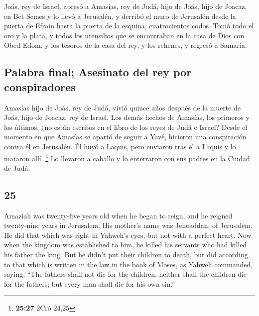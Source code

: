 \begin{paracol}{2}
 Joás, rey de Israel, apresó a Amasías, rey de Judá, hijo
de Joás, hijo de Joacaz, en Bet Semes y lo llevó a Jerusalén, y derribó
el muro de Jerusalén desde la puerta de Efraín hasta la puerta de la
esquina, cuatrocientos codos.  Tomó todo el oro y la
plata, y todos los utensilios que se encontraban en la casa de Dios con
Obed-Edom, y los tesoros de la casa del rey, y los rehenes, y regresó a
Samaria.

\hypertarget{palabra-final-asesinato-del-rey-por-conspiradores}{%
\subsection{Palabra final; Asesinato del rey por
conspiradores}\label{palabra-final-asesinato-del-rey-por-conspiradores}}

 Amasías hijo de Joás, rey de Judá, vivió quince años
después de la muerte de Joás, hijo de Joacaz, rey de Israel.
 Los demás hechos de Amasías, los primeros y los últimos,
¿no están escritos en el libro de los reyes de Judá e Israel?
 Desde el momento en que Amasías se apartó de seguir a
Yavé, hicieron una conspiración contra él en Jerusalén. Él huyó a
Laquis, pero enviaron tras él a Laquis y lo mataron allí. \footnote{\textbf{25:27}
  2Cró 24,25}  Lo llevaron a caballo y lo enterraron con
sus padres en la Ciudad de Judá.

\switchcolumn
\begin{otherlanguage}{english}

\hypertarget{section-49}{%
\section{25}\label{section-49}}

 Amaziah was twenty-five years old when he began to reign,
and he reigned twenty-nine years in Jerusalem. His mother's name was
Jehoaddan, of Jerusalem.  He did that which was right in
Yahweh's eyes, but not with a perfect heart.  Now when the
kingdom was established to him, he killed his servants who had killed
his father the king.  But he didn't put their children to
death, but did according to that which is written in the law in the book
of Moses, as Yahweh commanded, saying, ``The fathers shall not die for
the children, neither shall the children die for the fathers; but every
man shall die for his own sin.''


\end{otherlanguage}
\end{paracol}
